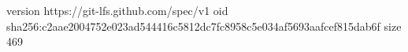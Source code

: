 version https://git-lfs.github.com/spec/v1
oid sha256:c2aae2004752e023ad544416c5812dc7fc8958c5e034af5693aafcef815dab6f
size 469
